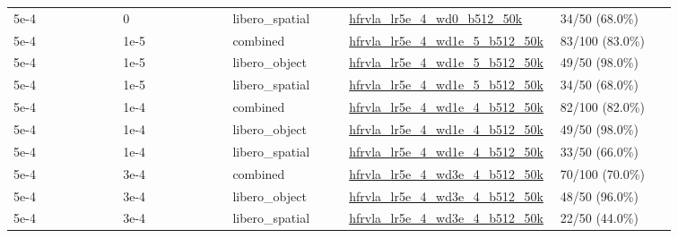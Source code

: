 \begin{small}
\begin{longtable}{@{}p{0.16\linewidth}p{0.16\linewidth}p{0.17\linewidth}p{0.20\linewidth}p{0.17\linewidth}@{}}
5e-4 & 0 & libero\_spatial & \url{hfrvla_lr5e_4_wd0_b512_50k} & 34/50 (68.0\%) \\
5e-4 & 1e-5 & combined & \url{hfrvla_lr5e_4_wd1e_5_b512_50k} & 83/100 (83.0\%) \\
5e-4 & 1e-5 & libero\_object & \url{hfrvla_lr5e_4_wd1e_5_b512_50k} & 49/50 (98.0\%) \\
5e-4 & 1e-5 & libero\_spatial & \url{hfrvla_lr5e_4_wd1e_5_b512_50k} & 34/50 (68.0\%) \\
5e-4 & 1e-4 & combined & \url{hfrvla_lr5e_4_wd1e_4_b512_50k} & 82/100 (82.0\%) \\
5e-4 & 1e-4 & libero\_object & \url{hfrvla_lr5e_4_wd1e_4_b512_50k} & 49/50 (98.0\%) \\
5e-4 & 1e-4 & libero\_spatial & \url{hfrvla_lr5e_4_wd1e_4_b512_50k} & 33/50 (66.0\%) \\
5e-4 & 3e-4 & combined & \url{hfrvla_lr5e_4_wd3e_4_b512_50k} & 70/100 (70.0\%) \\
5e-4 & 3e-4 & libero\_object & \url{hfrvla_lr5e_4_wd3e_4_b512_50k} & 48/50 (96.0\%) \\
5e-4 & 3e-4 & libero\_spatial & \url{hfrvla_lr5e_4_wd3e_4_b512_50k} & 22/50 (44.0\%) \\
\end{longtable}
\end{small}
